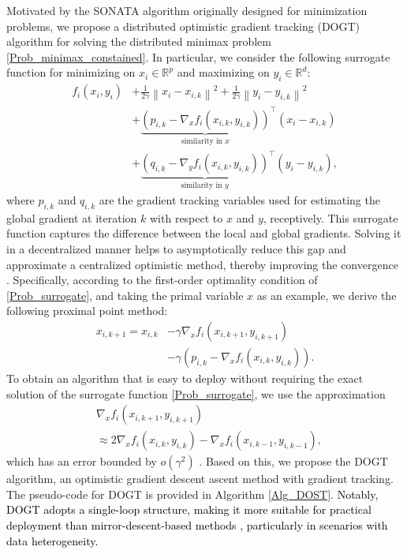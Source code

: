 \documentclass[10pt,a4paper]{amsart}
\def \hy #1{\textcolor{black}{#1}}
\begin{document}
Motivated by the SONATA algorithm \cite{sonata} originally designed for minimization problems, we propose a distributed optimistic gradient tracking (DOGT) algorithm for solving the distributed minimax problem \eqref{Prob_minimax_constained}. In particular, we consider the following surrogate function for minimizing on $x_i\in\mathbb{R}^p$ and maximizing on $y_i\in\mathbb{R}^d$:
\begin{equation}\label{Prob_surrogate}
\begin{aligned}
f_i\left( x_i,y_i \right) &+\frac{1}{2\gamma}\left\| x_i-x_{i,k} \right\| ^2+\frac{1}{2\gamma}\left\| y_i-y_{i,k} \right\| ^2
\\
&+\underset{\mathrm{similarity \,\, in \,\,} x}{\underbrace{\left( p_{i,k}-\nabla _xf_i\left( x_{i,k},y_{i,k} \right) \right) }}^{\top}\left( x_i-x_{i,k} \right) 
\\
&+\underset{\mathrm{similarity \,\, in \,\,} y}{\underbrace{\left( q_{i,k}-\nabla _yf_i\left( x_{i,k},y_{i,k} \right) \right) }}^{\top}\left( y_i-y_{i,k} \right),
\end{aligned}
\end{equation}
where $p_{i,k}$ and $q_{i,k}$ are the gradient tracking variables used for estimating the global gradient at iteration $k$ with respect to $x$ and $y$, receptively. This surrogate function captures the difference between the local and global gradients. Solving it in a decentralized manner helps to asymptotically reduce this gap and approximate a centralized optimistic method, thereby improving the convergence \cite{sonata}.
Specifically, according to the first-order optimality condition of \eqref{Prob_surrogate}, and taking the primal variable $x$ as an example, we derive the following proximal point method:
\begin{equation}
\begin{aligned}
x_{i,k+1}=x_{i,k}&-\gamma \nabla _xf_i\left( x_{i,k+1}, y_{i,k+1} \right) 
\\
&-\gamma \left( p_{i,k}-\nabla_x f_i\left( x_{i,k},y_{i,k} \right) \right).
\end{aligned}
\end{equation}
To obtain an algorithm that is easy to deploy without requiring the exact solution of the surrogate function \eqref{Prob_surrogate}, we use the approximation 
\begin{equation}
\begin{aligned}
&\nabla _xf_i\left( x_{i,k+1},y_{i,k+1} \right) 
\\
&\approx 2\nabla _xf_i\left( x_{i,k},y_{i,k} \right) -\nabla _xf_i\left( x_{i,k-1},y_{i,k-1} \right),
\end{aligned}
\end{equation}
which has an error bounded by $o\left( \gamma^2 \right)$ \cite{mokhtari2020unified}. Based on this, we propose the DOGT algorithm, an optimistic gradient descent ascent method with gradient tracking. The pseudo-code for DOGT is provided in Algorithm \ref{Alg_DOST}. \hy{Notably, DOGT adopts a single-loop structure, making it more suitable for practical deployment than mirror-descent-based methods \cite{sonata, beznosikov2021distributed}, particularly in scenarios with data heterogeneity.}
\end{document}
